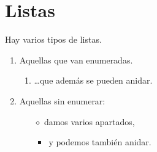 \chapter{Listas}

Hay varios tipos de listas.
\begin{enumerate}[1)]
\item Aquellas que van enumeradas.
	\begin{enumerate}
	\item \ldots que además se pueden anidar.
	\end{enumerate}

\item Aquellas sin enumerar:
\begin{itemize}
\item[$\diamond$] damos varios apartados, %
\begin{itemize}
\item y podemos también anidar.
\end{itemize}
\end{itemize}
\end{enumerate}

